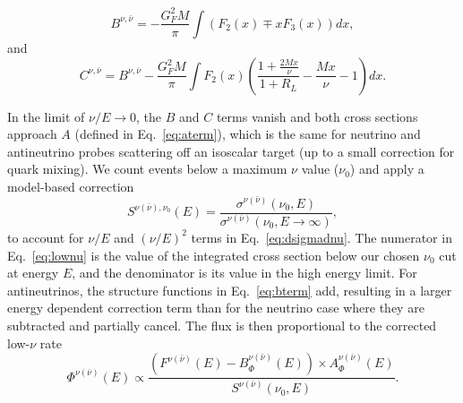 \documentclass[aps,preprint,showpacs,superscriptaddress,linenumbers,nofootinbib,prd,12pt]{revtex4}
\newcommand{\flux}{\ensuremath{\Phi^{\nu(\bar{\nu})}(E)}}
\newcommand{\fluxuc}{\ensuremath{\Phi_{uc}^{\nu(\bar{\nu})}(E)}}
\newcommand{\fsam}{\ensuremath{F^{\nu(\bar{\nu})}(E)}}
\newcommand{\aflux}{\ensuremath{A_{\Phi}^{\nu(\bar{\nu})}(E)}}
\newcommand{\bflux}{\ensuremath{B_{\Phi}^{\nu(\bar{\nu})}(E)}}
\newcommand{\nucor}{\ensuremath{S^{\nu(\bar{\nu})}(\nu_0,E)}}
\begin{document}
\begin{equation}
B^{\nu, \bar{\nu}}=-\frac{G^{2}_{F}M}{\pi}\int (F_{2}(x)\mp xF_{3}(x))dx,
\label{eq:bterm}
\end{equation}
and
\begin{equation}
C^{\nu, \bar{\nu}}=B^{\nu, \bar{\nu}}-\frac{G^{2}_{F}M}{\pi}\int F_{2}(x)
\left(\frac{1+\frac{2Mx}{\nu}}{1+R_{L}}-\frac{Mx}{\nu}-1\right)dx.
\end{equation}

In the limit of $\nu/E \rightarrow 0$, the $B$ and $C$ terms vanish and both cross sections 
approach $A$ (defined in Eq.~\eqref{eq:aterm}),
which is the same for neutrino and antineutrino probes scattering off an 
isoscalar target (up to a small correction for quark mixing).
We count events below a maximum $\nu$ value ($\nu_0$) and 
apply a model-based correction
\begin{equation}
S^{\nu(\bar{\nu}),\nu_0}(E) =\frac{\sigma^{\nu(\bar{\nu})}(\nu_0,E)}{\sigma^{\nu(\bar{\nu})}(\nu_0, E\to\infty)},
\label{eq:lownu}
\end{equation}
to account for $\nu/E$ and  $(\nu/E)^{2}$ terms in Eq.~\eqref{eq:dsigmadnu}. The 
numerator in Eq.~\eqref{eq:lownu} is the value of the
integrated cross section below our chosen $\nu_0$ cut at energy $E$, and the denominator 
is its value in the high energy limit.
For antineutrinos, the structure functions in Eq.~\eqref{eq:bterm} add, resulting in a larger energy dependent
correction term than for the neutrino case where they are subtracted and partially cancel.
The flux is then proportional to the corrected low-$\nu$ rate
\begin{equation}
\flux \propto \frac{(\fsam{}-\bflux{})\times\aflux{}}
{\nucor{}}.
\label{eq:prop_flux}
\end{equation}
\end{document}
